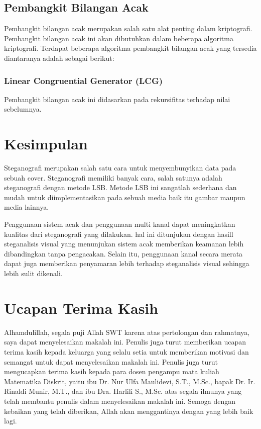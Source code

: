 \documentclass[10pt,conference]{IEEEtran}
\theoremstyle{definition}
\begin{document}
\subsection{Pembangkit Bilangan Acak}
Pembangkit bilangan acak merupakan salah satu alat penting dalam kriptografi. Pembangkit bilangan acak ini akan dibutuhkan dalam beberapa algoritma kriptografi. Terdapat beberapa algoritma pembangkit bilangan acak yang tersedia diantaranya adalah sebagai berikut:

\subsubsection{Linear Congruential Generator (LCG)}

Pembangkit bilangan acak ini didasarkan pada rekursifitas terhadap nilai sebelumnya.


\section{Kesimpulan}
Steganografi merupakan salah satu cara untuk menyembunyikan data pada sebuah cover. Steganografi memiliki banyak cara, salah satunya adalah steganografi dengan metode LSB. Metode LSB ini sangatlah sederhana dan mudah
untuk diimplementasikan pada sebuah media baik itu gambar maupun media lainnya. 

Penggunaan sistem acak dan penggunaan multi kanal dapat meningkatkan kualitas dari steganografi yang dilakukan. hal ini ditunjukan dengan hasill steganalisis visual yang menunjukan sistem acak memberikan keamanan lebih
dibandingkan tanpa pengacakan. Selain itu, penggunaan kanal secara merata dapat juga memberikan penyamaran lebih terhadap steganalisis visual sehingga lebih sulit dikenali.

\section*{Ucapan Terima Kasih}
Alhamdulillah, segala puji Allah SWT karena atas pertolongan dan rahmatnya, saya dapat menyelesaikan makalah ini. Penulis juga turut memberikan ucapan terima kasih kepada keluarga yang selalu setia untuk
memberikan motivasi dan semangat untuk dapat menyelesaikan makalah ini. Penulis juga turut mengucapkan terima kasih kepada para dosen pengampu mata kuliah Matematika Diskrit, yaitu ibu Dr. Nur Ulfa Maulidevi, S.T., M.Sc., bapak Dr. Ir.
Rinaldi Munir, M.T., dan ibu Dra. Harlili S., M.Sc. atas segala ilmunya yang telah membantu penulis dalam menyelesaikan makalah ini. Semoga dengan kebaikan yang telah diberikan, Allah akan menggantinya dengan yang lebih baik lagi.
\end{document}
